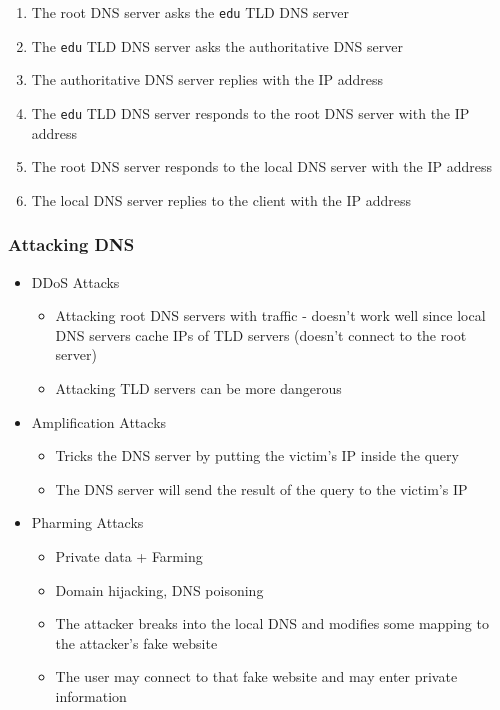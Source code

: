 \begin{itemize}
\begin{enumerate}
		\item The root DNS server asks the \texttt{edu} TLD DNS server
		\item The \texttt{edu} TLD DNS server asks the authoritative DNS server
		\item The authoritative DNS server replies with the IP address
		\item The \texttt{edu} TLD DNS server responds to the root DNS server with the IP address
		\item The root DNS server responds to the local DNS server with the IP address
		\item The local DNS server replies to the client with the IP address
	\end{enumerate}
\end{itemize}

\subsubsection{Attacking DNS}
\begin{itemize}
	\item DDoS Attacks
	\begin{itemize}
		\item Attacking root DNS servers with traffic - doesn't work well since local DNS servers cache IPs of TLD servers (doesn't connect to the root server)
		\item Attacking TLD servers can be more dangerous
	\end{itemize}
	\item Amplification Attacks
	\begin{itemize}
		\item Tricks the DNS server by putting the victim's IP inside the query
		\item The DNS server will send the result of the query to the victim's IP
	\end{itemize}
	\item Pharming Attacks
	\begin{itemize}
		\item Private data + Farming
		\item Domain hijacking, DNS poisoning
		\item The attacker breaks into the local DNS and modifies some mapping to the attacker's fake website
		\item The user may connect to that fake website and may enter private information
	\end{itemize}
\end{itemize}

